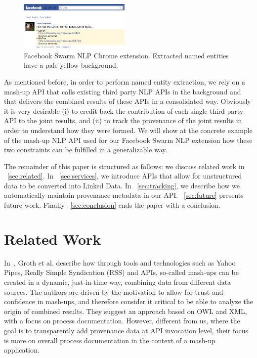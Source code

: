 \documentclass[conference]{IEEEtran}
\begin{document}
\begin{figure}[htb!]
  \centering
    \includegraphics[width=0.48\textwidth]{facebook-swarm-nlp.png}
  \caption{Facebook Swarm NLP Chrome extension. Extracted named entities have a pale yellow background.}     
  \label{fig:facebook}
\end{figure}

As mentioned before, in order to perform named entity extraction, we rely on a mash-up API that calls existing third party NLP APIs in the background and that delivers the combined results of these APIs in a consolidated way. Obviously it is very desirable (i) to credit back the contribution of each single third party API to the joint results, and (ii) to track the provenance of the joint results in order to understand how they were formed. We will show at the concrete example of the mash-up NLP API used for our Facebook Swarm NLP extension how these two constraints can be fulfilled in a generalizable way.

The remainder of this paper is structured as follows: we discuss related work in ~\autoref{sec:related}. In ~\autoref{sec:services}, we introduce APIs that allow for unstructured data to be converted into Linked Data. In ~\autoref{sec:tracking}, we describe how we automatically maintain provenance metadata in our API. ~\autoref{sec:future} presents future work. Finally ~\autoref{sec:conclusion} ends the paper with a conclusion.

\section{Related Work}\label{sec:related}
In~\cite{Groth:2009:MPD:1462159.1462162}, Groth et al. describe how through tools and technologies such as Yahoo Pipes, Really Simple Syndication (RSS) and APIs, so-called mash-ups can be created in a dynamic, just-in-time way, combining data from different data sources. The authors are driven by the motivation to allow for trust and confidence in mash-ups, and therefore consider it critical to be able to analyze the origin of combined results. They suggest an approach based on OWL and XML, with a focus on process documentation. However, different from us, where the goal is to transparently add provenance data at API invocation level, their focus is more on overall process documentation in the context of a mash-up application.
\end{document}
